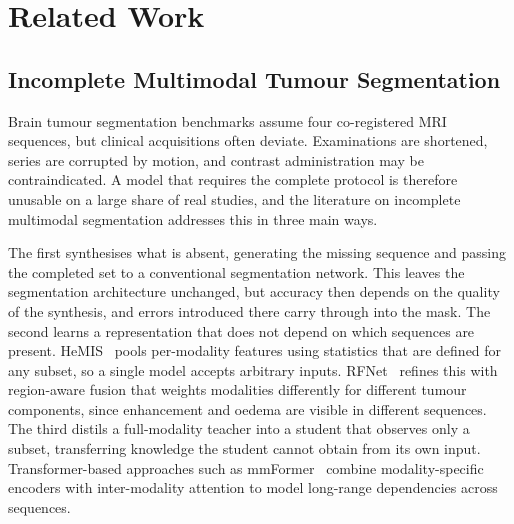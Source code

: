 %
%

\section{Related Work}
\label{sec:related_work}

\subsection{Incomplete Multimodal Tumour Segmentation}
\label{subsec:rw-incomplete}

Brain tumour segmentation benchmarks assume four co-registered MRI sequences,
but clinical acquisitions often deviate. Examinations are shortened, series
are corrupted by motion, and contrast administration may be contraindicated. A
model that requires the complete protocol is therefore unusable on a large
share of real studies, and the literature on incomplete multimodal
segmentation addresses this in three main ways.

The first synthesises what is absent, generating the missing sequence and
passing the completed set to a conventional segmentation network. This leaves
the segmentation architecture unchanged, but accuracy then depends on the
quality of the synthesis, and errors introduced there carry through into the
mask. The second learns a representation that does not depend on which
sequences are present. HeMIS~\cite{hemis} pools per-modality features using
statistics that are defined for any subset, so a single model accepts
arbitrary inputs. RFNet~\cite{rfnet} refines this with region-aware fusion
that weights modalities differently for different tumour components, since
enhancement and oedema are visible in different sequences. The third distils a
full-modality teacher into a student that observes only a subset, transferring
knowledge the student cannot obtain from its own input. Transformer-based
approaches such as mmFormer~\cite{mmformer} combine modality-specific encoders
with inter-modality attention to model long-range dependencies across
sequences.

